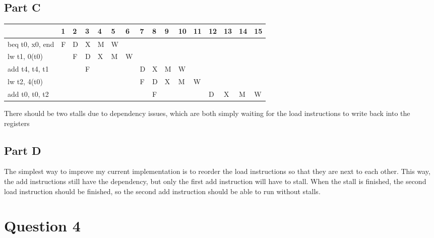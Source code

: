 \documentclass[letter]{article}
\theoremstyle{case}
\begin{document}
\subsection*{Part C}
\begin{table}[!h]
\centering
\begin{tabular}{l|l|l|l|l|l|l|l|l|l|l|l|l|l|l|l}
                                      & 1 & 2 & 3 & 4 & 5 & 6 & 7 & 8 & 9 & 10 & 11 & 12 & 13 & 14 & 15                     \\ \hline
\multicolumn{1}{|l|}{beq t0, x0, end} & F & D & X & M & W &   &   &   &   &    &    &    &    &    & \multicolumn{1}{l|}{}  \\ \hline
\multicolumn{1}{|l|}{lw t1, 0(t0)}    &   & F & D & X & M & W &   &   &   &    &    &    &    &    & \multicolumn{1}{l|}{}  \\ \hline
\multicolumn{1}{|l|}{add t4, t4, t1}  &   &   & F &   &   &   & D & X & M & W  &    &    &    &    & \multicolumn{1}{l|}{}  \\ \hline
\multicolumn{1}{|l|}{lw t2, 4(t0)}    &   &   &   &   &   &   & F & D & X & M  & W  &    &    &    & \multicolumn{1}{l|}{}  \\ \hline
\multicolumn{1}{|l|}{add t0, t0, t2}  &   &   &   &   &   &   &   & F &   &    &    & D  & X  & M  & \multicolumn{1}{l|}{W} \\ \hline
\end{tabular}
\end{table}
There should be two stalls due to dependency issues, which are both simply waiting for the load instructions to write back into the registers 
\subsection*{Part D}
The simplest way to improve my current implementation is to reorder the load instructions so that they are next to each other. This way, the add instructions still have the dependency, but only the first add instruction will have to stall. When the stall is finished, the second load instruction should be finished, so the second add instruction should be able to run without stalls.

\section*{Question 4}
\end{document}
